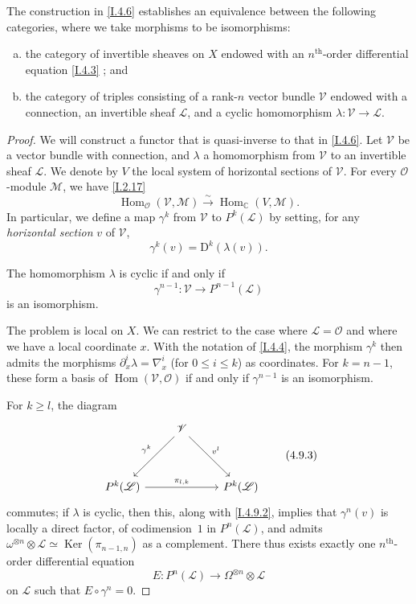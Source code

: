 \documentclass{report}
\theoremstyle{plain}
\newenvironment{proposition}[1]
    {\renewcommand\theinnercustomproposition{#1}\innercustomproposition}
    {\endinnercustomproposition}
\newenvironment{lemma}[1]
    {\renewcommand\theinnercustomlemma{#1}\innercustomlemma}
    {\endinnercustomlemma}
\theoremstyle{definition}
\newcommand{\sh}{\mathscr}
\newcommand{\CC}{\mathbb{C}}
\newcommand{\DD}{\mathrm{D}}
\renewcommand{\geq}{\geqslant}
\renewcommand{\leq}{\leqslant}
\DeclareMathOperator{\Ker}{Ker}
\DeclareMathOperator{\Hom}{Hom}
\newcommand{\oldpage}[1]{\marginpar{\footnotesize$\Big\vert$ \textit{p.~#1}}}
\begin{document}
\begin{proposition}{4.9}
\label{I.4.9}
  The construction in \cref{I.4.6} establishes an equivalence between the following categories, where we take morphisms to be isomorphisms:
  \begin{enumerate}[a)]
    \item the category of invertible sheaves on $X$ endowed with an $n^\mathrm{th}$-order differential equation \cref{I.4.3} ; and
    \item the category of triples consisting of a rank-$n$ vector bundle $\sh{V}$ endowed with a connection, an invertible sheaf $\sh{L}$, and a cyclic homomorphism $\lambda\colon\sh{V}\to\sh{L}$.
  \end{enumerate}
\end{proposition}

\begin{proof}
  We will construct a functor that is quasi-inverse to that in \cref{I.4.6}.
  Let $\sh{V}$ be a vector bundle with connection, and $\lambda$ a homomorphism from $\sh{V}$ to an invertible sheaf $\sh{L}$.
  We denote by $V$ the local system of horizontal sections of $\sh{V}$.
  For every $\sh{O}$-module $\sh{M}$, we have \cref{I.2.17}
  \[
    \Hom_\sh{O}(\sh{V},\sh{M}) \xrightarrow{\sim} \Hom_\CC(V,\sh{M}).
  \]
  In particular, we define a map $\gamma^k$ from $\sh{V}$ to $P^k(\sh{L})$ by setting, for any \emph{horizontal section} $v$ of $\sh{V}$,
  \[
  \label{I.4.9.1}
    \gamma^k(v) = \DD^k(\lambda(v)).
  \tag{4.9.1}
  \]

  \begin{lemma}{4.9.2}
  \label{I.4.9.2}
    The homomorphism $\lambda$ is cyclic if and only if
    \[
      \gamma^{n-1}\colon \sh{V} \to P^{n-1}(\sh{L})
    \]
    is an isomorphism.
  \end{lemma}

  The problem is local on $X$.
  We can restrict to the case where $\sh{L}=\sh{O}$ and where we have a local coordinate $x$.
  With the notation of \cref{I.4.4}, the morphism $\gamma^k$ then admits the morphisms $\partial_x^i\lambda = \nabla_x^i$ (for $0\leq i\leq k$) as coordinates.
  For $k=n-1$, these form a basis of $\Hom(\sh{V},\sh{O})$ if and only if $\gamma^{n-1}$ is an isomorphism.

  For $k\geq l$, the diagram
\oldpage{28}
  \[
  \label{I.4.9.3}
    \begin{tikzcd}[row sep=huge]
      & \sh{V} \dlar[swap,"\gamma^k"] \drar["v^l"] &
    \\P^k(\sh{L}) \ar[rr,"\pi_{l,k}"] && P^k(\sh{L})
    \end{tikzcd}
  \tag{4.9.3}
  \]
  commutes;
  if $\lambda$ is cyclic, then this, along with \cref{I.4.9.2}, implies that $\gamma^n(v)$ is locally a direct factor, of codimension~$1$ in $P^n(\sh{L})$, and admits $\omega^{\otimes n}\otimes\sh{L} \simeq \Ker(\pi_{n-1,n})$ as a complement.
  There thus exists exactly one $n^\mathrm{th}$-order differential equation
  \[
    E\colon P^n(\sh{L}) \to \Omega^{\otimes n}\otimes\sh{L}
  \]
  on $\sh{L}$ such that $E\circ\gamma^n=0$.


\end{proof}
\end{document}

